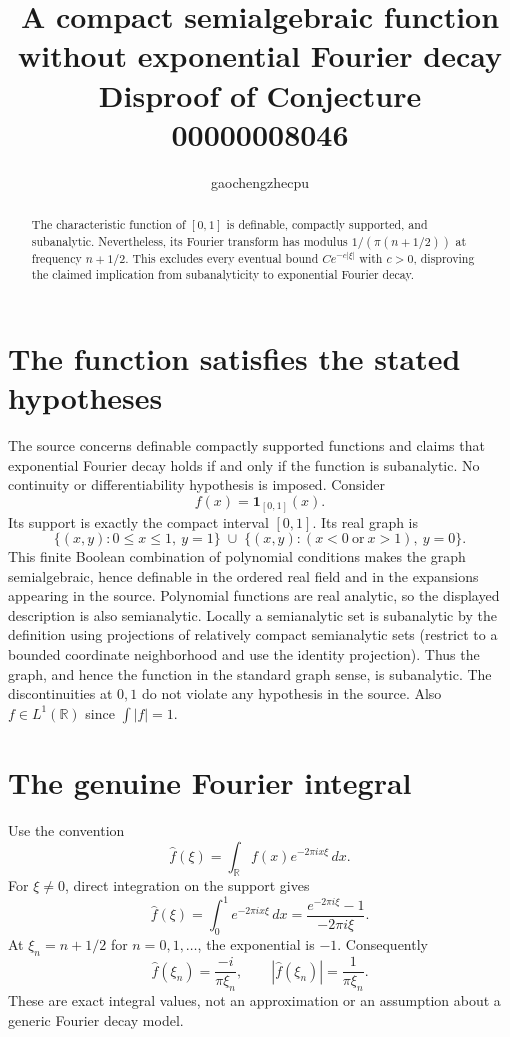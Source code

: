 \documentclass[11pt]{article}
\title{A compact semialgebraic function without exponential Fourier decay\\
\large Disproof of Conjecture 00000008046}
\author{gaochengzhecpu}\date{}
\newcommand{\R}{\mathbb R}
\begin{document}
\maketitle
\begin{abstract}
The characteristic function of $[0,1]$ is definable, compactly supported,
and subanalytic. Nevertheless, its Fourier transform has modulus
$1/(\pi(n+1/2))$ at frequency $n+1/2$. This excludes every eventual
bound $Ce^{-c|\xi|}$ with $c>0$, disproving the claimed implication
from subanalyticity to exponential Fourier decay.
\end{abstract}

\section*{The function satisfies the stated hypotheses}
The source concerns definable compactly supported functions and claims
that exponential Fourier decay holds if and only if the function is
subanalytic. No continuity or differentiability hypothesis is imposed.
Consider
\[
 f(x)=\mathbf1_{[0,1]}(x).
\]
Its support is exactly the compact interval $[0,1]$. Its real graph is
\[
 \{(x,y):0\le x\le1,\ y=1\}
 \;\cup\;
 \{(x,y):(x<0\ \text{or}\ x>1),\ y=0\}.
\]
This finite Boolean combination of polynomial conditions makes the
graph semialgebraic, hence definable in the ordered real field and in
the expansions appearing in the source. Polynomial functions are
real analytic, so the displayed description is also semianalytic.
Locally a semianalytic set is subanalytic by the definition using
projections of relatively compact semianalytic sets (restrict to a
bounded coordinate neighborhood and use the identity projection).
Thus the graph, and hence the function in the standard graph sense,
is subanalytic. The discontinuities at $0,1$ do not violate any
hypothesis in the source. Also $f\in L^1(\R)$ since $\int|f|=1$.

\section*{The genuine Fourier integral}
Use the convention
\[
 \widehat f(\xi)=\int_{\R}f(x)e^{-2\pi i x\xi}\,dx.
\]
For $\xi\ne0$, direct integration on the support gives
\[
 \widehat f(\xi)=\int_0^1e^{-2\pi i x\xi}\,dx
       =\frac{e^{-2\pi i\xi}-1}{-2\pi i\xi}.
\]
At $\xi_n=n+1/2$ for $n=0,1,\ldots$, the exponential is $-1$.
Consequently
\[
 \widehat f(\xi_n)=\frac{-i}{\pi\xi_n},\qquad
 |\widehat f(\xi_n)|=\frac1{\pi\xi_n}.
\]
These are exact integral values, not an approximation or an
assumption about a generic Fourier decay model.
\end{document}
